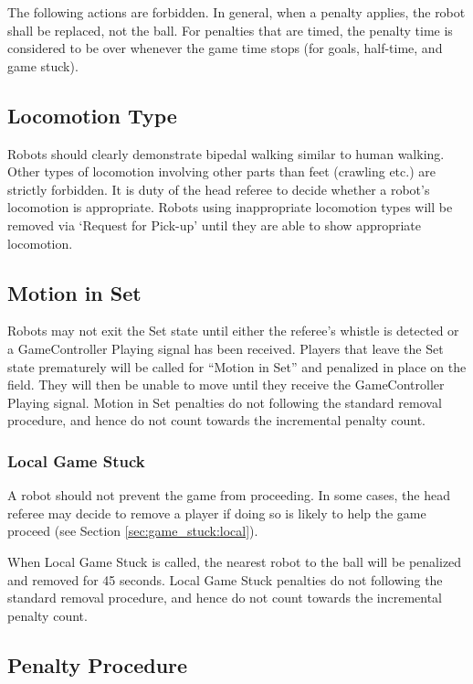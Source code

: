 \documentclass[12pt]{article}
\begin{document}
The following actions are forbidden. In general, when a penalty applies, the robot shall be replaced, not the ball. For penalties that are timed, the penalty time is considered to be over whenever the game time stops (for goals, half-time, and game stuck).

\subsection{Locomotion Type}
\label{sec:locomotion_type}

Robots should clearly demonstrate bipedal walking similar to human walking. Other types of locomotion involving other parts than feet (crawling etc.) are strictly forbidden. It is duty of the head referee to decide whether a robot's locomotion is appropriate. Robots using inappropriate locomotion types will be removed via `Request for Pick-up' until they are able to show appropriate locomotion.

\subsection{Motion in Set}
\label{sec:motion_in_set}

Robots may not exit the Set state until either the referee's whistle is detected or a GameController Playing signal has been received.  Players that leave the Set state prematurely will be called for ``Motion in Set'' and penalized in place on the field.  They will then be unable to move until they receive the GameController Playing signal.  Motion in Set penalties do not following the standard removal procedure, and hence do not count towards the incremental penalty count.

\subsubsection{Local Game Stuck}
\label{sec:pen_local_game_stuck}

A robot should not prevent the game from proceeding.  In some cases, the head referee may decide to remove a player if doing so is likely to help the game proceed (see Section \ref{sec:game_stuck:local}).

When Local Game Stuck is called, the nearest robot to the ball will be penalized and removed for 45 seconds. Local Game Stuck penalties do not following the standard removal procedure, and hence do not count towards the incremental penalty count.

\subsection{Penalty Procedure}
\label{sec:penalty_procedure}
\end{document}
